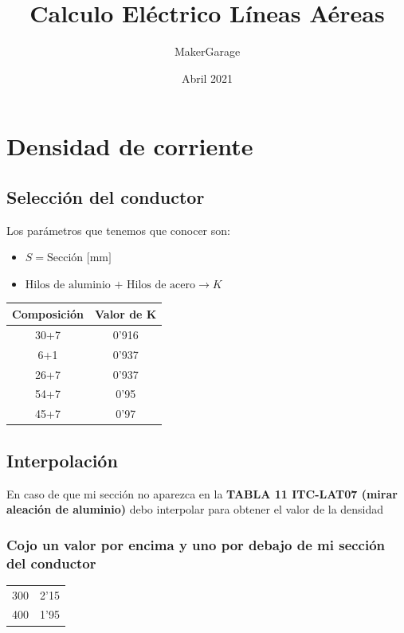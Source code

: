 \documentclass[10pt,a4paper]{article}
\title{Calculo Eléctrico Líneas Aéreas}
\author{MakerGarage}
\date{Abril 2021}
\begin{document}
\maketitle
\newpage
\tableofcontents
\newpage

\section{Densidad de corriente}
\subsection{Selección del conductor}
Los parámetros que tenemos que conocer son:
\begin{itemize}
    \item $S = \text{Sección [mm]}$
    \item $\text{Hilos de aluminio + Hilos de acero} \xrightarrow{} K$
\end{itemize}
\begin{tabular}{| c | c |}
\hline
Composición & Valor de K \\ \hline
30+7 & 0'916 \\
6+1  & 0'937 \\
26+7  & 0'937 \\
54+7 & 0'95 \\ 
45+7  & 0'97 \\\hline
\end{tabular}


\subsection{Interpolación}
En caso de que mi sección no aparezca en la \textbf{TABLA 11 ITC-LAT07 (mirar aleación de aluminio)} debo interpolar para obtener el valor de la densidad
\\
\subsubsection{Cojo un valor por encima y uno por debajo de mi sección del conductor}
\begin{tabular}{ c c } 
 
 300 \hspace{0.25cm} \xrightarrow{} & 2'15 \\
 400 \hspace{0.25cm} \xrightarrow{} & 1'95 \\
 
\end{tabular}
\\
\end{document}
